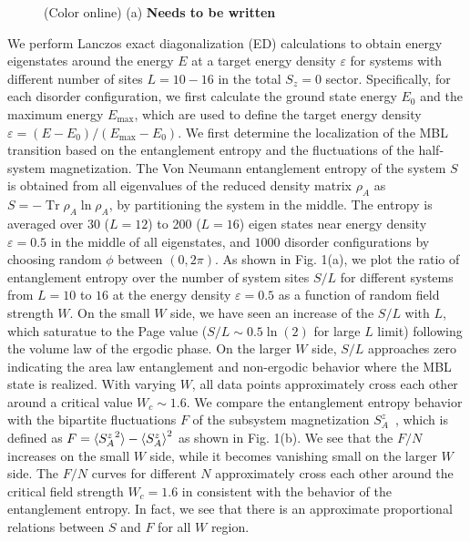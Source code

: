 \documentclass[prl,aps,epsf,showpacs,twocolumn,letterpaper]{revtex4}
\DeclareMathOperator{\tr}{Tr}
\begin{document}
\begin{figure}[b]
  \caption{(Color online) (a)
    \bf Needs to be written
  }
\label{fig5}
\end{figure} 


We  perform Lanczos exact diagonalization (ED) calculations   to obtain  energy
eigenstates around  the energy $E$ at a target  energy  density $\varepsilon$
for  systems with different  number of sites $L=10-16$  in the total $S_z=0$
sector.  Specifically, for each disorder configuration, we first calculate the
ground state energy  $E_0$ and the maximum energy $E_\text{max}$, which are used
to define the target energy density $\varepsilon = (E-E_0)/(E_\text{max} -E_0)$.
We first determine the localization of the MBL transition based on the
entanglement entropy and the fluctuations of the half-system
magnetization\cite{luitz2015}.  The Von Neumann entanglement entropy of the
system  $S$ is obtained  from all eigenvalues of the reduced density matrix
$\rho_A$ as $S=- \tr \rho_A \ln \rho_A$, by partitioning the system in  the
middle.  The entropy is averaged over 30 ($L=12$) to 200 ($L=16$) eigen states
near energy density $\varepsilon=0.5$ in the middle of all eigenstates,   and
$1000$ disorder configurations by choosing random $\phi$ between $(0, 2\pi)$.
As shown in  Fig. 1(a), we plot the  ratio of  entanglement entropy over the
number of system sites  $S/L$ for  different systems  from $L=10$ to $16$  at
the energy density $\varepsilon =0.5$ as a function of random field strength
$W$.  On the  small $W$ side, we have seen an increase of the $S/L$ with $L$,
which saturatue to the Page value ($S/L \sim 0.5\ln(2)$ for large $L$ limit)
following the volume law of the ergodic phase.    On the  larger $W$ side, $S/L$
approaches zero indicating the area law  entanglement and non-ergodic behavior
where the MBL state is realized.  With varying $W$,  all data points
approximately cross each other around  a critical value  $W_c \sim 1.6$.  We
compare the entanglement entropy behavior with the  bipartite fluctuations $F$
of the subsystem magnetization $S^z_A$~\cite{luitz2015,song2012}, which is
defined as $F=\braket{{S^{z}_A}^2} - \braket{S^z_A}^2$ as shown  in Fig. 1(b).
We see that the $F/N$ increases on the  small  $W$ side, while it becomes
vanishing small on the larger $W$ side.  The $F/N$ curves for different $N$
approximately cross each other around the critical field strength $W_c=1.6$ in
consistent with the behavior of the entanglement entropy.  In fact, we see that
there is an approximate proportional relations between $S$ and $F$  for all $W$
region. 
\end{document}
